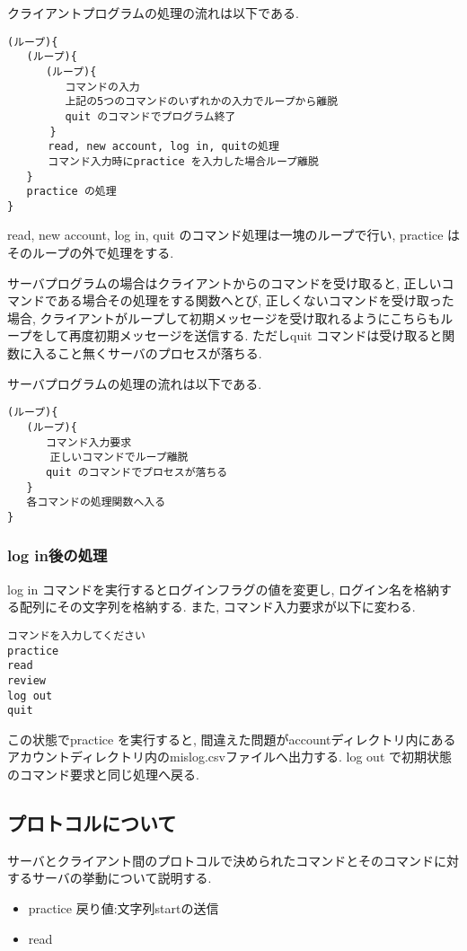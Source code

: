 \documentclass[a4j]{jarticle}
\begin{document}
クライアントプログラムの処理の流れは以下である.
\begin{verbatim}
(ループ){
   (ループ){
      (ループ){
         コマンドの入力
         上記の5つのコマンドのいずれかの入力でループから離脱
         quit のコマンドでプログラム終了
　　　　}
   　　read, new account, log in, quitの処理
   　　コマンド入力時にpractice を入力した場合ループ離脱
   }
   practice の処理
}
\end{verbatim}
read, new account, log in, quit のコマンド処理は一塊のループで行い, practice はそのループの外で処理をする.

サーバプログラムの場合はクライアントからのコマンドを受け取ると, 正しいコマンドである場合その処理をする関数へとび, 正しくないコマンドを受け取った場合, クライアントがループして初期メッセージを受け取れるようにこちらもループをして再度初期メッセージを送信する. ただしquit コマンドは受け取ると関数に入ること無くサーバのプロセスが落ちる.

サーバプログラムの処理の流れは以下である.
\begin{verbatim}
(ループ){
   (ループ){
      コマンド入力要求
　　　　正しいコマンドでループ離脱
      quit のコマンドでプロセスが落ちる
   }
   各コマンドの処理関数へ入る
}
\end{verbatim}


\subsubsection{log in後の処理}
log in コマンドを実行するとログインフラグの値を変更し, ログイン名を格納する配列にその文字列を格納する. 
また, コマンド入力要求が以下に変わる.
\begin{verbatim}
コマンドを入力してください
practice
read
review
log out
quit
\end{verbatim}
この状態でpractice を実行すると, 間違えた問題がaccountディレクトリ内にあるアカウントディレクトリ内のmislog.csvファイルへ出力する. 
log out で初期状態のコマンド要求と同じ処理へ戻る.

\subsection{プロトコルについて}
サーバとクライアント間のプロトコルで決められたコマンドとそのコマンドに対するサーバの挙動について説明する.
\begin{itemize}
\item practice
戻り値:文字列startの送信
\item read



\end{itemize}
\end{document}
